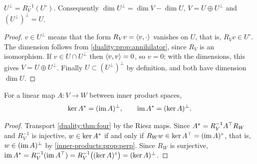 \begin{notechapter}
\begin{proposition}
\label{inner-products:prop:perp}
$U^\perp = R_V^{-1}(U^\circ)$. Consequently
$\dim U^\perp = \dim V - \dim U$, $V = U\oplus U^\perp$ and
$(U^\perp)^\perp = U$.
\end{proposition}

\begin{proof}
$v\in U^\perp$ means that the form $R_Vv = \left\langle v, \cdot \right\rangle$ vanishes on $U$,
that is, $R_Vv\in U^\circ$. The dimension follows from
\cref{duality:prop:annihilator}, since $R_V$ is an isomorphism. If
$v\in U\cap U^\perp$ then $\left\langle v, v \right\rangle = 0$, so $v = 0$; with the dimensions,
this gives $V = U\oplus U^\perp$. Finally $U\subset(U^\perp)^\perp$ by
definition, and both have dimension $\dim U$.
\end{proof}

\begin{theorem}\label{inner-products:thm:four}
For a linear map $A:V\to W$ between inner product spaces,
\[
  \ker A^{*} = (\operatorname{im} A)^\perp ,
  \qquad
  \operatorname{im}A^{*} = (\ker A)^\perp .
\]
\end{theorem}

\begin{proof}
Transport \cref{duality:thm:four} by the Riesz maps. Since
$A^{*} = R_V^{-1}A^{\top}R_W$ and $R_V^{-1}$ is injective,
$w\in\ker A^{*}$ if and only if $R_Ww\in\ker A^{\top} = (\operatorname{im} A)^\circ$, that
is, $w\in(\operatorname{im} A)^\perp$ by \cref{inner-products:prop:perp}. Since $R_W$ is
surjective, $\operatorname{im}A^{*} = R_V^{-1}(\operatorname{im}A^{\top}) = R_V^{-1}\bigl((\ker
A)^\circ\bigr) = (\ker A)^\perp$.
\end{proof}


\end{notechapter}
